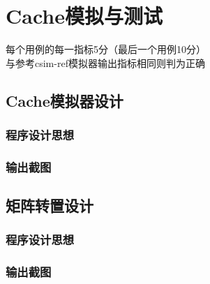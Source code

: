 \section{Cache模拟与测试}
\begin{center}
    每个用例的每一指标5分（最后一个用例10分）\\
    与参考csim-ref模拟器输出指标相同则判为正确
\end{center}

\subsection{Cache模拟器设计}


\subsubsection{程序设计思想}

\subsubsection{输出截图}


\subsection{矩阵转置设计}


\subsubsection{程序设计思想}

\subsubsection{输出截图}

